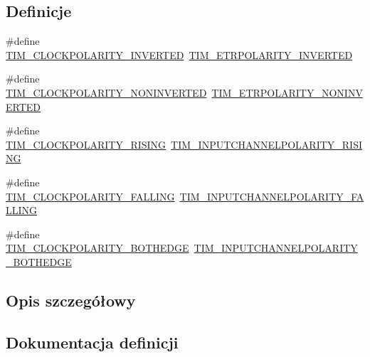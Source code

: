 \subsection*{Definicje}
\begin{DoxyCompactItemize}
\item 
\#define \hyperlink{group___t_i_m___clock___polarity_gae4eb585c466c2b5709ae3795204e7d3f}{T\+I\+M\+\_\+\+C\+L\+O\+C\+K\+P\+O\+L\+A\+R\+I\+T\+Y\+\_\+\+I\+N\+V\+E\+R\+T\+ED}~\hyperlink{group___t_i_m___e_t_r___polarity_ga42652ff688f0042659f8304ae08abfa6}{T\+I\+M\+\_\+\+E\+T\+R\+P\+O\+L\+A\+R\+I\+T\+Y\+\_\+\+I\+N\+V\+E\+R\+T\+ED}
\item 
\#define \hyperlink{group___t_i_m___clock___polarity_gaca342866be2f9364274584688c733b60}{T\+I\+M\+\_\+\+C\+L\+O\+C\+K\+P\+O\+L\+A\+R\+I\+T\+Y\+\_\+\+N\+O\+N\+I\+N\+V\+E\+R\+T\+ED}~\hyperlink{group___t_i_m___e_t_r___polarity_ga7fa7c43245b25564414b2e191d5d8b14}{T\+I\+M\+\_\+\+E\+T\+R\+P\+O\+L\+A\+R\+I\+T\+Y\+\_\+\+N\+O\+N\+I\+N\+V\+E\+R\+T\+ED}
\item 
\#define \hyperlink{group___t_i_m___clock___polarity_ga13cc7002cfa5ee42607e1a3d85f77b10}{T\+I\+M\+\_\+\+C\+L\+O\+C\+K\+P\+O\+L\+A\+R\+I\+T\+Y\+\_\+\+R\+I\+S\+I\+NG}~\hyperlink{group___t_i_m___input___channel___polarity_ga4f4cede88a4ad4b33e81f2567e9bb08f}{T\+I\+M\+\_\+\+I\+N\+P\+U\+T\+C\+H\+A\+N\+N\+E\+L\+P\+O\+L\+A\+R\+I\+T\+Y\+\_\+\+R\+I\+S\+I\+NG}
\item 
\#define \hyperlink{group___t_i_m___clock___polarity_ga9c17ca08b6179792f5ced4e607808c0a}{T\+I\+M\+\_\+\+C\+L\+O\+C\+K\+P\+O\+L\+A\+R\+I\+T\+Y\+\_\+\+F\+A\+L\+L\+I\+NG}~\hyperlink{group___t_i_m___input___channel___polarity_ga07441a8c0a52234e30f471c23803450c}{T\+I\+M\+\_\+\+I\+N\+P\+U\+T\+C\+H\+A\+N\+N\+E\+L\+P\+O\+L\+A\+R\+I\+T\+Y\+\_\+\+F\+A\+L\+L\+I\+NG}
\item 
\#define \hyperlink{group___t_i_m___clock___polarity_ga89bf9a7962d09fb58ceae4d1e28e1c89}{T\+I\+M\+\_\+\+C\+L\+O\+C\+K\+P\+O\+L\+A\+R\+I\+T\+Y\+\_\+\+B\+O\+T\+H\+E\+D\+GE}~\hyperlink{group___t_i_m___input___channel___polarity_gaab2598881d1f19158e77723c5d29d6ac}{T\+I\+M\+\_\+\+I\+N\+P\+U\+T\+C\+H\+A\+N\+N\+E\+L\+P\+O\+L\+A\+R\+I\+T\+Y\+\_\+\+B\+O\+T\+H\+E\+D\+GE}
\end{DoxyCompactItemize}


\subsection{Opis szczegółowy}


\subsection{Dokumentacja definicji}
\mbox{\label{group___t_i_m___clock___polarity_ga89bf9a7962d09fb58ceae4d1e28e1c89}} 
